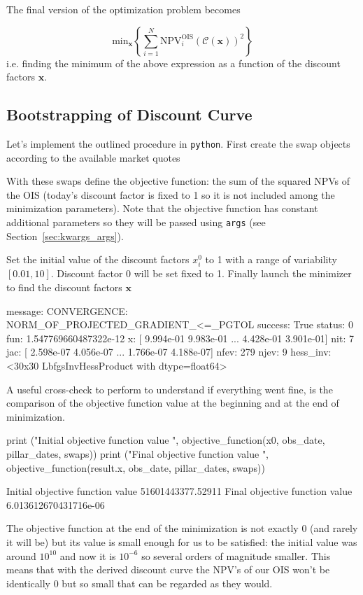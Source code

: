 The final version of the optimization problem becomes

\begin{equation}
 \mathrm{min}_{\mathbf{x}} \left\{\sum_{i=1}^{N}\mathrm{NPV}^\mathrm{OIS}_i( \mathcal{C}(\mathbf{x}))^2\right\}
\end{equation}
i.e. finding the minimum of the above expression as a function of the discount factors $\mathbf{x}$.

\subsection{Bootstrapping of Discount Curve}
Let's implement the outlined procedure in \texttt{python}. First create the swap objects according to the available market quotes

With these swaps define the objective function: the sum of the squared NPVs of the OIS (today's discount factor is fixed to 1 so it is not included among the minimization parameters). Note that the objective function has constant additional parameters so they will be passed using \texttt{args} (see Section~\ref{sec:kwargs_args}). 

Set the initial value of the discount factors $x_i^0$ to 1 with a range of variability $[0.01, 10]$. Discount factor 0 will be set fixed to 1.
Finally launch the minimizer to find the discount factors $\mathbf{x}$


\begin{ioutput}
  message: CONVERGENCE: NORM_OF_PROJECTED_GRADIENT_<=_PGTOL
  success: True
   status: 0
      fun: 1.547769660487322e-12
        x: [ 9.994e-01  9.983e-01 ...  4.428e-01  3.901e-01]
      nit: 7
      jac: [ 2.598e-07  4.056e-07 ...  1.766e-07  4.188e-07]
     nfev: 279
     njev: 9
 hess_inv: <30x30 LbfgsInvHessProduct with dtype=float64>
 \end{ioutput}

A useful cross-check to perform to understand if everything went fine, is the comparison of the objective function value at the beginning and at the end of minimization.

\begin{ipython}
print ("Initial objective function value ", objective_function(x0, obs_date, 
                                          pillar_dates, swaps))
print ("Final objective function value ", objective_function(result.x, obs_date,
                                          pillar_dates, swaps))
\end{ipython}
\begin{ioutput}
Initial objective function value  51601443377.52911
Final objective function value  6.013612670431716e-06
\end{ioutput}
The objective function at the end of the minimization is not exactly 0 (and rarely it will be) but its value is small enough for us to be satisfied: the initial value was around $10^{10}$ and now it is $10^{-6}$ so several orders of magnitude smaller. This means that with the derived discount curve the NPV's of our OIS won't be identically 0 but so small that can be regarded as they would.

